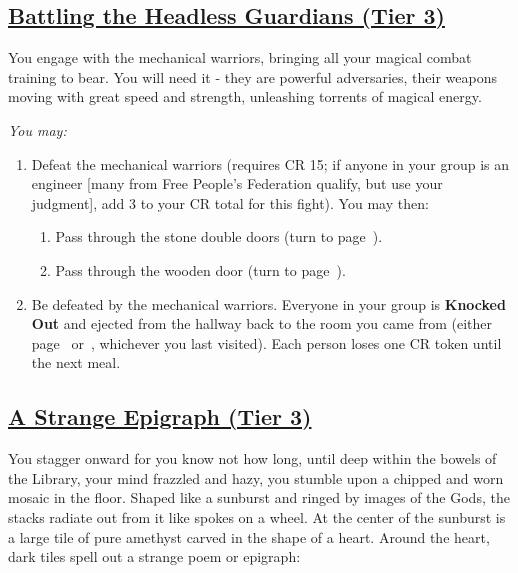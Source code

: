 \documentclass[sheet]{GL2020}
\begin{document}
\clearpage

\begin{center}\section*{\underline{Battling the Headless Guardians (Tier 3)}}\end{center}
\label{BattleHeadlessGuardians}

You engage with the mechanical warriors, bringing all your magical combat training to bear. You will need it -  they are powerful adversaries, their weapons moving with great speed and strength, unleashing torrents of magical energy. 

\vspace{0.5cm}

\begingroup
\itshape
You may:
\begin{enumerate}[A]
  \item Defeat the mechanical warriors (requires CR 15; if anyone in your group is an engineer [many from Free People’s Federation qualify, but use your judgment], add 3 to your CR total for this fight). You may then:
	\begin{enumerate}
		\item Pass through the stone double doors (turn to page~\pageref{ChamberofRelics}).
		\item Pass through the wooden door (turn to page~\pageref{DeeperStacks}).
	\end{enumerate}
	\item Be defeated by the mechanical warriors. Everyone in your group is \textbf{Knocked Out} and ejected from the hallway back to the room you came from (either page~\pageref{DeeperStacks} or~\pageref{ChamberofRelics}, whichever you last visited). Each person loses one CR token until the next meal.
\end{enumerate}
\endgroup

\clearpage

\begin{center}\section*{\underline{A Strange Epigraph (Tier 3)}}\end{center}
\label{StrangeEpigraph}

You stagger onward for you know not how long, until deep within the bowels of the Library, your mind frazzled and hazy, you stumble upon a chipped and worn mosaic in the floor. Shaped like a sunburst and ringed by images of the Gods, the stacks radiate out from it like spokes on a wheel. At the center of the sunburst is a large tile of pure amethyst carved in the shape of a heart. Around the heart, dark tiles spell out a strange poem or epigraph:
\end{document}
